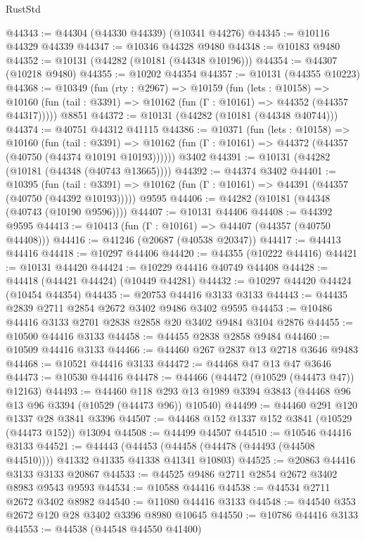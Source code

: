 \begin{lexlean}{RustStd}
\begin{coremodule}
@44343 := @44304 (@44330 @44339) (@10341 @44276)
@44345 := @10116 @44329 @44339
@44347 := @10346 @44328 @9480
@44348 := @10183 @9480
@44352 := @10131 (@44282 (@10181 (@44348 @10196)))
@44354 := @44307 (@10218 @9480)
@44355 := @10202 @44354
@44357 := @10131 (@44355 @10223)
@44368 := @10349
    (fun (rty : @2967) =>
    @10159
      (fun (lets : @10158) =>
      @10160 (fun (tail : @3391) => @10162 (fun (Γ : @10161) => @44352 (@44357 @44317)))))
    @8851
@44372 := @10131 (@44282 (@10181 (@44348 @40744)))
@44374 := @40751 @44312 @41115
@44386 := @10371
    (fun (lets : @10158) =>
    @10160
      (fun (tail : @3391) =>
      @10162 (fun (Γ : @10161) => @44372 (@44357 (@40750 (@44374 @10191 @10193))))))
    @3402
@44391 := @10131 (@44282 (@10181 (@44348 (@40743 @13665))))
@44392 := @44374 @3402
@44401 := @10395
    (fun (tail : @3391) => @10162 (fun (Γ : @10161) => @44391 (@44357 (@40750 (@44392 @10193)))))
    @9595
@44406 := @44282 (@10181 (@44348 (@40743 (@10190 @9596))))
@44407 := @10131 @44406
@44408 := @44392 @9595
@44413 := @10413 (fun (Γ : @10161) => @44407 (@44357 (@40750 @44408)))
@44416 := @41246 (@20687 (@40538 @20347))
@44417 := @44413 @44416
@44418 := @10297 @44406
@44420 := @44355 (@10222 @44416)
@44421 := @10131 @44420
@44424 := @10229 @44416 @40749 @44408
@44428 := @44418 (@44421 @44424) (@10449 @44281)
@44432 := @10297 @44420 @44424 (@10454 @44354)
@44435 := @20753 @44416 @3133 @3133
@44443 := @44435 @2839 @2711 @2854 @2672 @3402 @9486 @3402 @9595
@44453 := @10486 @44416 @3133 @2701 @2838 @2858 @20 @3402 @9484 @3104 @2876
@44455 := @10500 @44416 @3133
@44458 := @44455 @2838 @2858 @9484
@44460 := @10509 @44416 @3133
@44466 := @44460 @267 @2837 @13 @2718 @3646 @9483
@44468 := @10521 @44416 @3133
@44472 := @44468 @47 @13 @47 @3646
@44473 := @10530 @44416
@44478 := @44466 (@44472 (@10529 (@44473 @47)) @12163)
@44493 := @44460
    @118
    @293
    @13
    @1989
    @3394
    @3843
    (@44468 @96 @13 @96 @3394 (@10529 (@44473 @96)) @10540)
@44499 := @44460 @291 @120 @1337 @28 @3841 @3396
@44507 := @44468 @152 @1337 @152 @3841 (@10529 (@44473 @152)) @13094
@44508 := @44499 @44507
@44510 := @10546 @44416 @3133
@44521 := @44443
    (@44453 (@44458 (@44478 (@44493 (@44508 @44510)))) @41332 @41335 @41338 @41341 @10803)
@44525 := @20863 @44416 @3133 @3133 @20867
@44533 := @44525 @9486 @2711 @2854 @2672 @3402 @8983 @9543 @9593
@44534 := @10588 @44416
@44538 := @44534 @2711 @2672 @3402 @8982
@44540 := @11080 @44416 @3133
@44548 := @44540 @353 @2672 @120 @28 @3402 @3396 @8980 @10645
@44550 := @10786 @44416 @3133
@44553 := @44538 (@44548 @44550 @41400)

\end{coremodule}
\end{lexlean}
